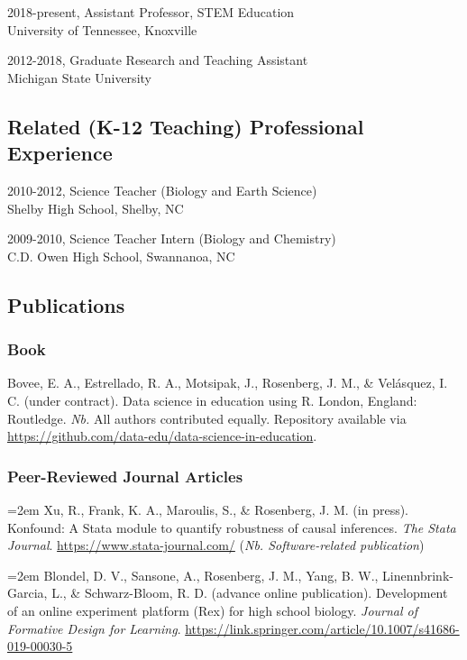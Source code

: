\documentclass[14,]{article}
\begin{document}
2018-present, Assistant Professor, STEM Education\\
University of Tennessee, Knoxville

2012-2018, Graduate Research and Teaching Assistant\\
Michigan State University

\hypertarget{related-k-12-teaching-professional-experience}{%
\subsection{Related (K-12 Teaching) Professional
Experience}\label{related-k-12-teaching-professional-experience}}

2010-2012, Science Teacher (Biology and Earth Science)\\
Shelby High School, Shelby, NC

2009-2010, Science Teacher Intern (Biology and Chemistry)\\
C.D. Owen High School, Swannanoa, NC

\hypertarget{publications}{%
\subsection{Publications}\label{publications}}

\hypertarget{book}{%
\subsubsection{Book}\label{book}}

Bovee, E. A., Estrellado, R. A., Motsipak, J., Rosenberg, J. M., \&
Velásquez, I. C. (under contract). Data science in education using R.
London, England: Routledge. \emph{Nb.} All authors contributed equally.
Repository available via
\url{https://github.com/data-edu/data-science-in-education}.

\hypertarget{peer-reviewed-journal-articles}{%
\subsubsection{Peer-Reviewed Journal
Articles}\label{peer-reviewed-journal-articles}}

\hangindent=2em Xu, R., Frank, K. A., Maroulis, S., \& Rosenberg, J. M.
(in press). Konfound: A Stata module to quantify robustness of causal
inferences. \emph{The Stata Journal}.
\url{https://www.stata-journal.com/} (\emph{Nb. Software-related
publication})

\hangindent=2em Blondel, D. V., Sansone, A., Rosenberg, J. M., Yang, B.
W., Linennbrink-Garcia, L., \& Schwarz-Bloom, R. D. (advance online
publication). Development of an online experiment platform (Rex) for
high school biology. \emph{Journal of Formative Design for Learning}.
\url{https://link.springer.com/article/10.1007/s41686-019-00030-5}
\end{document}
